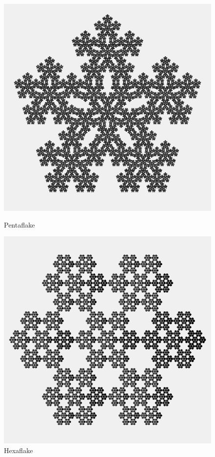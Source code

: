 \documentclass[dvipdfmx]{jsarticle}
\theoremstyle{definition}
\begin{document}
\begin{figure}[ht]
\begin{minipage}{0.5\hsize}
    \begin{center}
        \includegraphics[scale=0.20]{figure/pentaflake.png}
    \end{center}
    \caption{Pentaflake}
\end{minipage}
\begin{minipage}{0.49\hsize}
    \begin{center}
        \includegraphics[scale=0.20]{figure/hexaflake.png}
    \end{center}
    \caption{Hexaflake}
    \label{pic_hexfr}
\end{minipage}
\end{figure}
\end{document}
